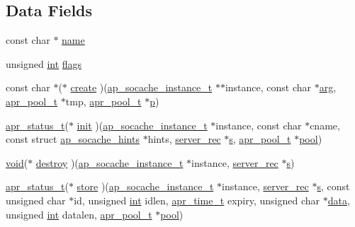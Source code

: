 \subsection*{Data Fields}
\begin{DoxyCompactItemize}
\item 
const char $\ast$ \hyperlink{structap__socache__provider__t_a988882b0dad04435f8aa846d91a98803}{name}
\item 
unsigned \hyperlink{pcre_8txt_a42dfa4ff673c82d8efe7144098fbc198}{int} \hyperlink{structap__socache__provider__t_a8cb231295671689e9757af48635c9086}{flags}
\item 
const char $\ast$($\ast$ \hyperlink{structap__socache__provider__t_aa820675e12d23565f939a4bf254b044a}{create} )(\hyperlink{structap__socache__instance__t}{ap\+\_\+socache\+\_\+instance\+\_\+t} $\ast$$\ast$instance, const char $\ast$\hyperlink{group__APACHE__CORE__MUTEX_gaf6517210150d97cd5cb8a17e3768770d}{arg}, \hyperlink{structapr__pool__t}{apr\+\_\+pool\+\_\+t} $\ast$tmp, \hyperlink{structapr__pool__t}{apr\+\_\+pool\+\_\+t} $\ast$\hyperlink{group__APACHE__CORE__MPM_ga5cd91701e5c167f2b1a38e70ab57817e}{p})
\item 
\hyperlink{group__apr__errno_gaa5105fa83cc322f09382292db8b47593}{apr\+\_\+status\+\_\+t}($\ast$ \hyperlink{structap__socache__provider__t_aefa99a603983b4ec31267de908362e6b}{init} )(\hyperlink{structap__socache__instance__t}{ap\+\_\+socache\+\_\+instance\+\_\+t} $\ast$instance, const char $\ast$cname, const struct \hyperlink{structap__socache__hints}{ap\+\_\+socache\+\_\+hints} $\ast$hints, \hyperlink{structserver__rec}{server\+\_\+rec} $\ast$\hyperlink{pcretest_8txt_a062597889ba244b72877454b1d3adecf}{s}, \hyperlink{structapr__pool__t}{apr\+\_\+pool\+\_\+t} $\ast$\hyperlink{group__APR__XLATE_gabb3cd978f04c73d0b763c391e9bfde73}{pool})
\item 
\hyperlink{group__MOD__ISAPI_gacd6cdbf73df3d9eed42fa493d9b621a6}{void}($\ast$ \hyperlink{structap__socache__provider__t_ad9a512cee36c6755408315dc12d2f720}{destroy} )(\hyperlink{structap__socache__instance__t}{ap\+\_\+socache\+\_\+instance\+\_\+t} $\ast$instance, \hyperlink{structserver__rec}{server\+\_\+rec} $\ast$\hyperlink{pcretest_8txt_a062597889ba244b72877454b1d3adecf}{s})
\item 
\hyperlink{group__apr__errno_gaa5105fa83cc322f09382292db8b47593}{apr\+\_\+status\+\_\+t}($\ast$ \hyperlink{structap__socache__provider__t_a0c61b7e1816ac41e315176dec1381619}{store} )(\hyperlink{structap__socache__instance__t}{ap\+\_\+socache\+\_\+instance\+\_\+t} $\ast$instance, \hyperlink{structserver__rec}{server\+\_\+rec} $\ast$\hyperlink{pcretest_8txt_a062597889ba244b72877454b1d3adecf}{s}, const unsigned char $\ast$id, unsigned \hyperlink{pcre_8txt_a42dfa4ff673c82d8efe7144098fbc198}{int} idlen, \hyperlink{group__apr__time_gadb4bde16055748190eae190c55aa02bb}{apr\+\_\+time\+\_\+t} expiry, unsigned char $\ast$\hyperlink{structdata}{data}, unsigned \hyperlink{pcre_8txt_a42dfa4ff673c82d8efe7144098fbc198}{int} datalen, \hyperlink{structapr__pool__t}{apr\+\_\+pool\+\_\+t} $\ast$\hyperlink{group__APR__XLATE_gabb3cd978f04c73d0b763c391e9bfde73}{pool})
$$
\end{DoxyCompactItemize}
